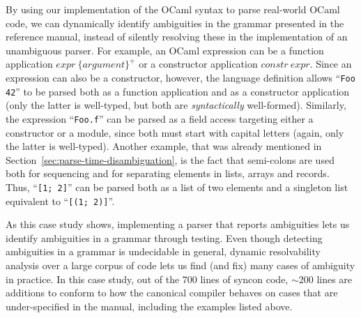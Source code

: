 \documentclass[runningheads]{llncs}
\newcommand{\ocaml}{\lstinline[language={[objective]caml}]}
\begin{document}
By using our implementation of the OCaml syntax to parse
real-world OCaml code, we can dynamically identify ambiguities in
the grammar presented in the reference manual, instead of silently
resolving these in the implementation of an unambiguous parser.
%
For example, an OCaml expression can be a function application
$\mathit{expr}~\{\mathit{argument}\}^{+}$ or a constructor
application $\mathit{constr}~\mathit{expr}$. Since an expression
can also be a constructor, however, the language definition allows
``\ocaml{Foo 42}'' to be parsed both as a function application and
as a constructor application (only the latter is well-typed, but
both are \emph{syntactically} well-formed).
%
Similarly, the expression ``\ocaml{Foo.f}'' can be parsed as a
field access targeting either a constructor or a module, since
both must start with capital letters (again, only the latter is
well-typed).
%
Another example, that was already mentioned in
Section~\ref{sec:parse-time-disambiguation}, is the fact that
semi-colons are used both for sequencing and for separating
elements in lists, arrays and records. Thus, ``\ocaml{[1; 2]}''
can be parsed both as a list of two elements and a singleton list
equivalent to ``\ocaml{[(1; 2)]}''.

As this case study shows, implementing a parser that reports
ambiguities lets us identify ambiguities in a grammar through
testing. Even though detecting ambiguities in a grammar is
undecidable in general, dynamic resolvability analysis over a
large corpus of code lets us find (and fix) many cases of
ambiguity in practice.
%
In this case study, out of the 700 lines of syncon code, $\sim$200
lines are additions to conform to how the canonical compiler
behaves on cases that are under-specified in the
manual, including the examples listed above.

\end{document}
